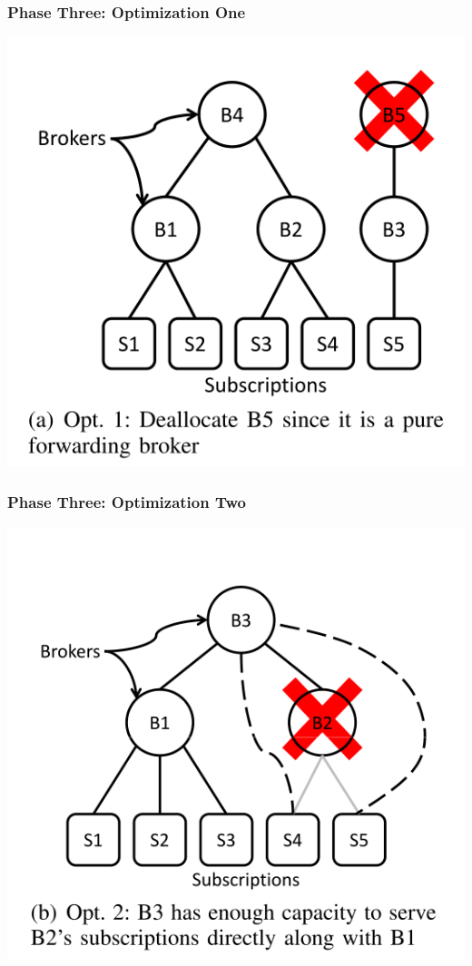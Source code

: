 \documentclass{beamer}
\begin{document}
\begin{frame}
\frametitle{Phase Three: Optimization One}
\includegraphics[scale=0.5]{opt_one.png}
\end{frame}

\begin{frame}
\frametitle{Phase Three: Optimization Two}
\includegraphics[scale=0.45]{opt_two.png}
\end{frame}
\end{document}
